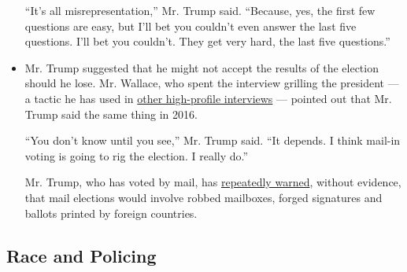 \begin{itemize}
  ``It's all misrepresentation,'' Mr. Trump said. ``Because, yes, the
  first few questions are easy, but I'll bet you couldn't even answer
  the last five questions. I'll bet you couldn't. They get very hard,
  the last five questions.''
\item
  Mr. Trump suggested that he might not accept the results of the
  election should he lose. Mr. Wallace, who spent the interview grilling
  the president --- a tactic he has used in
  \href{https://www.washingtonpost.com/lifestyle/style/chris-wallace-wants-journalists-to-push-for-the-truth-but-fox-news-often-traffics-in-propaganda/2019/12/15/64cf5b84-1f54-11ea-bed5-880264cc91a9_story.html}{other
  high-profile interviews} --- pointed out that Mr. Trump said the same
  thing in 2016.

  ``You don't know until you see,'' Mr. Trump said. ``It depends. I
  think mail-in voting is going to rig the election. I really do.''

  Mr. Trump, who has voted by mail, has
  \href{https://www.nytimes3xbfgragh.onion/article/mail-in-vote-fraud-ballot.html}{repeatedly
  warned}, without evidence, that mail elections would involve robbed
  mailboxes, forged signatures and ballots printed by foreign countries.
\end{itemize}

\hypertarget{race-and-policing}{%
\subsection{Race and Policing}\label{race-and-policing}}

